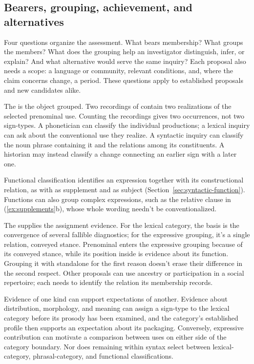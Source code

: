 \documentclass[12pt]{article}
\begin{document}
\subsection{Bearers, grouping, achievement, and alternatives}

Four questions organize the assessment. What bears membership? What groups
the members? What does the grouping help an investigator distinguish,
infer, or explain? And what alternative would serve the same inquiry?
Each proposal also needs a scope: a language or community, relevant
conditions, and, where the claim concerns change, a period. These
questions apply to established proposals and new candidates alike.

The  is the object grouped. Two recordings of  contain two realizations of the selected prenominal
 use. Counting the recordings gives two occurrences, not
two sign-types. A phonetician can classify the individual productions;
a lexical inquiry can ask about the conventional use they realize.
A syntactic inquiry can classify the noun phrase containing it and
the relations among its constituents. A historian may instead classify
a change connecting an earlier sign with a later one.

Functional classification identifies an expression together with its
constructional relation, as with  as supplement and as
subject (Section~\ref{sec:syntactic-function}). Functions can also group complex expressions, such as the relative
clause in (\ref{ex:supplements}b), whose whole wording needn't be conventionalized.

The  supplies the assignment evidence. For the
lexical category, the basis is the convergence of several fallible
diagnostics; for the expressive grouping, it's a single relation, conveyed
stance. Prenominal
 enters the expressive grouping because of its conveyed
stance, while its position inside  is evidence
about its function. Grouping it with standalone  for
the first reason doesn't erase their difference in the second respect.
Other proposals can use ancestry or participation in a social repertoire;
each needs to identify the relation its membership records.

Evidence of one kind can support expectations of another. Evidence about
distribution, morphology, and meaning can assign a sign-type to the lexical
category before its prosody has been examined, and the category's
established profile then supports an expectation about its packaging.
Conversely, expressive contribution can motivate a comparison between
 uses on either side of the category boundary. Nor does
remaining within syntax select between lexical-category, phrasal-category,
and functional classifications.
\end{document}
